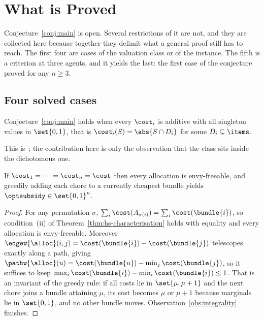 \section{What is Proved}
\label{sec:results}

Conjecture~\ref{conj:main} is open. Several restrictions of it are not, and they
are collected here because together they delimit what a general proof still has
to reach. The first four are cases of the valuation class or of the instance.
The fifth is a criterion at three agents, and it yields the last: the first case
of the conjecture proved for any $n \ge 3$.

\subsection{Four solved cases}
\label{sec:main-solved}

\begin{theorem}
\label{main:binadd}
Conjecture~\ref{conj:main} holds when every $\cost_i$ is additive with all
singleton values in $\set{0,1}$, that is
$\cost_i(S) = \abs{S \cap D_i}$ for some $D_i \subseteq \items$.
\end{theorem}

This is~\cite{LMS26}; the contribution here is only the observation that the
class sits inside the dichotomous one.

\begin{theorem}
\label{main:identical}
If $\cost_1 = \dots = \cost_n = \cost$ then every allocation is envy-freeable,
and greedily adding each chore to a currently cheapest bundle yields
$\optsubsidy \in \set{0,1}^n$.
\end{theorem}

\begin{proof}
For any permutation $\sigma$, $\sum_i \cost(A_{\sigma(i)}) = \sum_i
\cost(\bundle{i})$, so condition~(ii) of Theorem~\ref{thm:hs-characterisation}
holds with equality and every allocation is envy-freeable. Moreover
$\edgew{\alloc}(i,j) = \cost(\bundle{i}) - \cost(\bundle{j})$ telescopes exactly
along a path, giving $\pathw{\alloc}(u) = \cost(\bundle{u}) - \min_j
\cost(\bundle{j})$, so it suffices to keep $\max_i \cost(\bundle{i}) - \min_i
\cost(\bundle{i}) \le 1$. That is an invariant of the greedy rule: if all costs
lie in $\set{\mu,\mu+1}$ and the next chore joins a bundle attaining $\mu$, its
cost becomes $\mu$ or $\mu+1$ because marginals lie in $\set{0,1}$, and no other
bundle moves. Observation~\ref{obs:integrality} finishes.
\end{proof}


